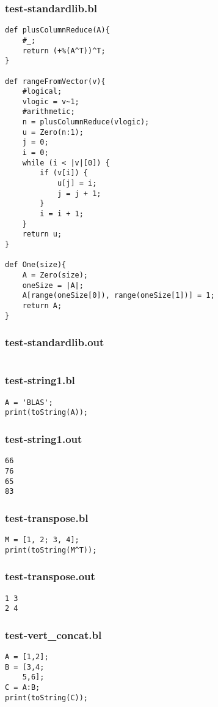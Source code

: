 \subsubsection{test-standardlib.bl}
\begin{lstlisting}
def plusColumnReduce(A){
    #_;
    return (+%(A^T))^T;
}

def rangeFromVector(v){
    #logical;
    vlogic = v~1;
    #arithmetic;
    n = plusColumnReduce(vlogic);
    u = Zero(n:1);
    j = 0;
    i = 0;
    while (i < |v|[0]) {
        if (v[i]) {
            u[j] = i;
            j = j + 1;
        }
        i = i + 1;
    }
    return u;
}

def One(size){
    A = Zero(size);
    oneSize = |A|;
    A[range(oneSize[0]), range(oneSize[1])] = 1;
    return A;
}
\end{lstlisting}
\subsubsection{test-standardlib.out}
\begin{lstlisting}
\end{lstlisting}
\subsubsection{test-string1.bl}
\begin{lstlisting}
A = 'BLAS';
print(toString(A));
\end{lstlisting}
\subsubsection{test-string1.out}
\begin{lstlisting}
66
76
65
83
\end{lstlisting}
\subsubsection{test-transpose.bl}
\begin{lstlisting}
M = [1, 2; 3, 4];
print(toString(M^T));\end{lstlisting}
\subsubsection{test-transpose.out}
\begin{lstlisting}
1 3
2 4\end{lstlisting}
\subsubsection{test-vert\_concat.bl}
\begin{lstlisting}
A = [1,2];
B = [3,4;
    5,6];
C = A:B;
print(toString(C));\end{lstlisting}
